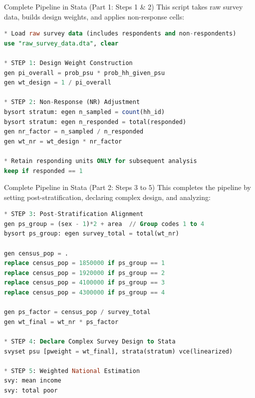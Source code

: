 \documentclass[10pt, aspectratio=169]{beamer}
\begin{document}
\begin{frame}[fragile]{Complete Pipeline in Stata (Part 1: Steps 1 \& 2)}
  This script takes raw survey data, builds design weights, and applies non-response cells:
  \begin{lstlisting}[language=SQL]
* Load raw survey data (includes respondents and non-respondents)
use "raw_survey_data.dta", clear

* STEP 1: Design Weight Construction
gen pi_overall = prob_psu * prob_hh_given_psu
gen wt_design = 1 / pi_overall

* STEP 2: Non-Response (NR) Adjustment
bysort stratum: egen n_sampled = count(hh_id)
bysort stratum: egen n_responded = total(responded)
gen nr_factor = n_sampled / n_responded
gen wt_nr = wt_design * nr_factor

* Retain responding units ONLY for subsequent analysis
keep if responded == 1
\end{lstlisting}
\end{frame}

\begin{frame}[fragile]{Complete Pipeline in Stata (Part 2: Steps 3 to 5)}
  This completes the pipeline by setting post-stratification, declaring complex design, and analyzing:
  \begin{lstlisting}[language=SQL]
* STEP 3: Post-Stratification Alignment
gen ps_group = (sex - 1)*2 + area  // Group codes 1 to 4
bysort ps_group: egen survey_total = total(wt_nr)

gen census_pop = .
replace census_pop = 1850000 if ps_group == 1
replace census_pop = 1920000 if ps_group == 2
replace census_pop = 4100000 if ps_group == 3
replace census_pop = 4300000 if ps_group == 4

gen ps_factor = census_pop / survey_total
gen wt_final = wt_nr * ps_factor

* STEP 4: Declare Complex Survey Design to Stata
svyset psu [pweight = wt_final], strata(stratum) vce(linearized)

* STEP 5: Weighted National Estimation
svy: mean income
svy: total poor
\end{lstlisting}
\end{frame}
\end{document}

